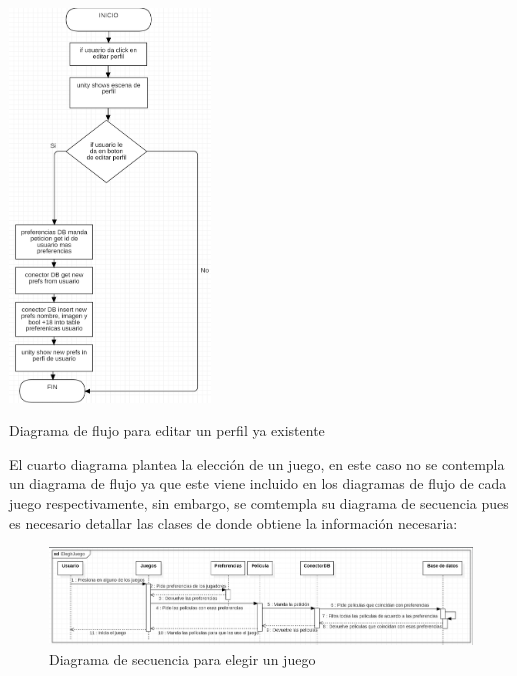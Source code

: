 \documentclass[12pt, oneside, letterpaper]{book}
\begin{document}
\begin{center}
	\centering
		\includegraphics[width=0.4\textwidth]{DFFNEditarPerfil.png}

	\caption{Diagrama de flujo para editar un perfil ya existente}
	\label{DFFNEditarPerfil}
\end{center}

\bigskip

\fontsize{14}{18}\selectfont
\par 
El cuarto diagrama plantea la elección de un juego, en este caso no se contempla un diagrama de flujo ya que este viene incluido en los diagramas de flujo de cada juego respectivamente, sin embargo, se comtempla su diagrama de secuencia pues es necesario detallar las clases de donde obtiene la información necesaria:

\begin{figure}[h]
    \begin{flushleft}
        \includegraphics[width=1.3\textwidth]{DSFNElegirJuego.png}
        \caption{Diagrama de secuencia para elegir un juego}
        \label{DSFNElegirJuego}
    \end{flushleft}
\end{figure}
\end{document}
